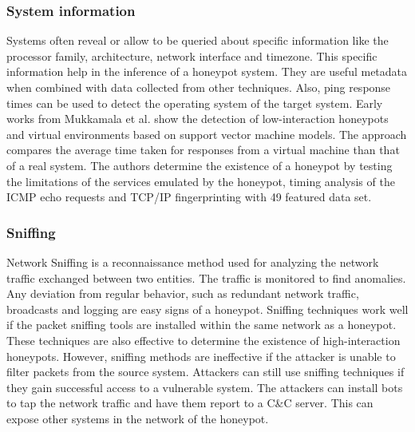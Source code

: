 \subsubsection{System information}
Systems often reveal or allow to be queried about specific information like the processor family, architecture, network interface and timezone. This specific information help in the inference of a honeypot system. They are useful metadata when combined with data collected from other techniques.  Also, ping response times can be used to detect the operating system of the target system. Early works from Mukkamala et al. \cite{mukkamala} show the detection of low-interaction honeypots and virtual environments based on support vector machine models. The approach compares the average time taken for responses from a virtual machine than that of a real system. The authors determine the existence of a honeypot by testing the limitations of the services emulated by the honeypot, timing analysis of the ICMP echo requests and TCP/IP fingerprinting with 49 featured data set.  
\newline
\subsubsection{Sniffing}
Network Sniffing is a reconnaissance method used for analyzing the network traffic exchanged between two entities. The traffic is monitored to find anomalies. Any deviation from regular behavior, such as redundant network traffic, broadcasts and logging are easy signs of a honeypot. Sniffing techniques work well if the packet sniffing tools are installed within the same network as a honeypot. These techniques are also effective to determine the existence of high-interaction honeypots. However, sniffing methods are ineffective if the attacker is unable to filter packets from the source system. Attackers can still use sniffing techniques if they gain successful access to a vulnerable system. The attackers can install bots to tap the network traffic and have them report to a C\&C server. This can expose other systems in the network of the honeypot.
\newline
